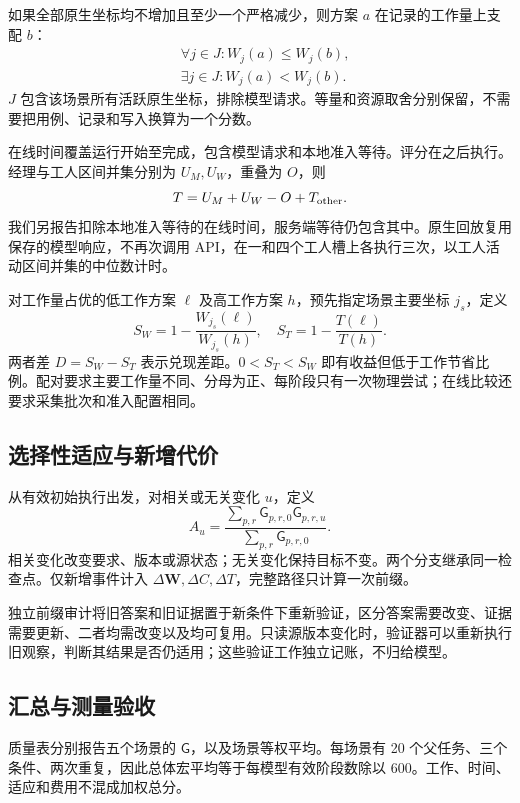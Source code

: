 \documentclass[11pt]{article}
\newcommand{\G}{\mathsf{G}}
\newcommand{\W}{\mathbf{W}}
\begin{document}
如果全部原生坐标均不增加且至少一个严格减少，则方案 $a$ 在记录的工作量上支配 $b$：
\begin{equation}
\begin{aligned}
&\forall j\in J:W_j(a)\le W_j(b),\\
&\exists j\in J:W_j(a)<W_j(b).
\end{aligned}
\end{equation}
$J$ 包含该场景所有活跃原生坐标，排除模型请求。等量和资源取舍分别保留，不需要把用例、记录和写入换算为一个分数。

在线时间覆盖运行开始至完成，包含模型请求和本地准入等待。评分在之后执行。经理与工人区间并集分别为 $U_M,U_W$，重叠为 $O$，则
\begin{equation}
T=U_M+U_W-O+T_{\rm other}.
\end{equation}
我们另报告扣除本地准入等待的在线时间，服务端等待仍包含其中。原生回放复用保存的模型响应，不再次调用 API，在一和四个工人槽上各执行三次，以工人活动区间并集的中位数计时。

对工作量占优的低工作方案 $\ell$ 及高工作方案 $h$，预先指定场景主要坐标 $j_s$，定义
\begin{equation}
S_W=1-\frac{W_{j_s}(\ell)}{W_{j_s}(h)},\quad
S_T=1-\frac{T(\ell)}{T(h)}.
\end{equation}
两者差 $D=S_W-S_T$ 表示兑现差距。$0<S_T<S_W$ 即有收益但低于工作节省比例。配对要求主要工作量不同、分母为正、每阶段只有一次物理尝试；在线比较还要求采集批次和准入配置相同。

\subsection{选择性适应与新增代价}
从有效初始执行出发，对相关或无关变化 $u$，定义
\begin{equation}
A_u=\frac{\sum_{p,r}\G_{p,r,0}\G_{p,r,u}}
{\sum_{p,r}\G_{p,r,0}}.
\end{equation}
相关变化改变要求、版本或源状态；无关变化保持目标不变。两个分支继承同一检查点。仅新增事件计入 $\Delta\W,\Delta C,\Delta T$，完整路径只计算一次前缀。

独立前缀审计将旧答案和旧证据置于新条件下重新验证，区分答案需要改变、证据需要更新、二者均需改变以及均可复用。只读源版本变化时，验证器可以重新执行旧观察，判断其结果是否仍适用；这些验证工作独立记账，不归给模型。

\subsection{汇总与测量验收}
质量表分别报告五个场景的 $\G$，以及场景等权平均。每场景有 20 个父任务、三个条件、两次重复，因此总体宏平均等于每模型有效阶段数除以 600。工作、时间、适应和费用不混成加权总分。
\end{document}
